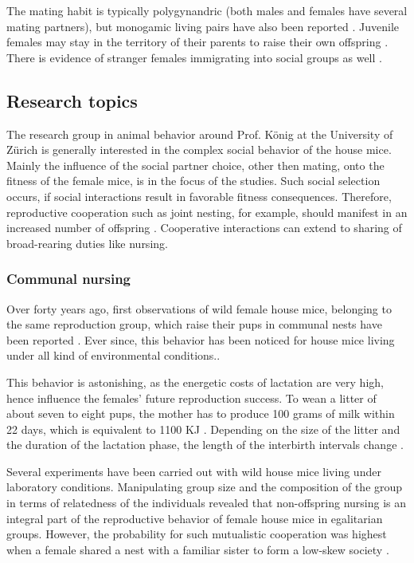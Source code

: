 The mating habit is typically polygynandric (both males and females have several mating partners), but monogamic living pairs have also been reported \citep{lidicker:76}. Juvenile females may stay in the territory of their parents to raise their own offspring \citep{petras:67}. There is evidence of stranger females immigrating into social groups as well \citep{anderson:65, reimer:67, selander:70, bronson:79, baker:81}.     

\subsection{Research topics}
\label{subsec:researchtopics}

The research group in animal behavior around Prof. K\"onig at the University of Z\"urich is generally interested in the complex social behavior of the house mice. Mainly the influence of the social partner choice, other then mating, onto the fitness of the female mice, is in the focus of the studies. Such social selection occurs, if social interactions result in favorable fitness consequences. Therefore, reproductive cooperation such as joint nesting, for example, should manifest in an increased number of offspring \citep{weidt:07}. Cooperative interactions can extend to sharing of broad-rearing duties like nursing.

\subsubsection{Communal nursing}
\label{subsubsec:comnurs}

Over forty years ago, first observations of wild female house mice, belonging to the same reproduction group, which raise their pups in communal nests have been reported \citep{southwick:55}. Ever since, this behavior has been noticed for house mice living under all kind of environmental conditions.\citep{crowcroft:63, sayler:69, gandelman:70, werboff:70, baker:81}.

This behavior is astonishing, as the energetic costs of lactation are very high, hence influence the females' future reproduction success. To wean a litter of about seven to eight pups, the mother has to produce 100 grams of milk within 22 days, which is equivalent to 1100 \acf{KJ} \citep{koenig:88}. Depending on the size of the litter and the duration of the lactation phase, the length of the interbirth intervals change \citep{fuchs:81, fuchs:82, koenig:87a, koenig:87b}.

Several experiments have been carried out with wild house mice living under laboratory conditions. Manipulating group size and the composition of the group in terms of relatedness of the individuals revealed that non-offspring nursing is an integral part of the reproductive behavior of female house mice in egalitarian groups. However, the probability for such mutualistic cooperation was highest when a female shared a nest with a familiar sister to form a low-skew society \citep{koenig:06}.

